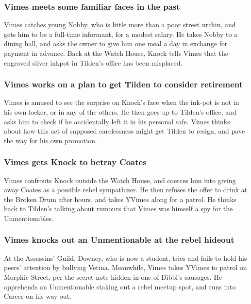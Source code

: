 \subsubsection{\Gls{Vimes} meets some familiar faces in the past}
\Gls{Vimes} catches young \Gls{Nobby}, who is little more than a poor street urchin, and gets him
to be a full-time informant, for a modest salary. He takes \Gls{Nobby} to a dining hall, and asks
the owner to give him one meal a day in exchange for payment in advance. Back at the Watch House,
\Gls{Knock} tells \Gls{Vimes} that the engraved silver inkpot in \Gls{Tilden}'s office has been
misplaced.

\subsubsection{\Gls{Vimes} works on a plan to get \Gls{Tilden} to consider retirement}
\Gls{Vimes} is amused to see the surprise on \Gls{Knock}'s face when the ink-pot is not in his own
locker, or in any of the others. He then goes up to \Gls{Tilden}'s office, and asks him to check if
he accidentally left it in his personal safe. \Gls{Vimes} thinks about how this act of supposed
carelessness might get \Gls{Tilden} to resign, and pave the way for his own promotion.

\subsubsection{\Gls{Vimes} gets \Gls{Knock} to betray \Gls{Coates}}
\Gls{Vimes} confronts \Gls{Knock} outside the Watch House, and coerces him into giving away
\Gls{Coates} as a possible rebel sympathizer. He then refuses the offer to drink at the Broken Drum
after hours, and takes \Gls{YVimes} along for a patrol. He thinks back to \Gls{Tilden}'s talking
about rumours that \Gls{Vimes} was himself a spy for the Unmentionables.

\subsubsection{\Gls{Vimes} knocks out an Unmentionable at the rebel hideout}
At the Assassins' Guild, \Gls{Downey}, who is now a student, tries and fails to hold his peers'
attention by bullying \Gls{Vetina}. Meanwhile, \Gls{Vimes} takes \Gls{YVimes} to patrol on Morphic
Street, per the secret note hidden in one of \Gls{Dibbl}'s sausages. He apprehends an Unmentionable
staking out a rebel meetup spot, and runs into \Gls{Carcer} on his way out.

